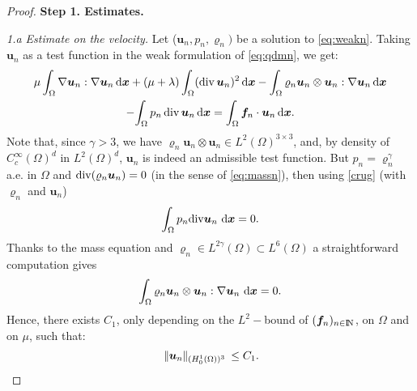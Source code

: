 \documentclass{amsart}
\numberwithin{equation}{section}
\begin{document}
\begin{proof}
{\bf Step 1. Estimates.}
 
{\it 1.a Estimate on the velocity.} Let (${{\boldsymbol u}}_n, p_n, {\varrho}_n)$ be a solution to \eqref{eq:weakn}.
Taking ${{\boldsymbol u}}_n$ as a test function in the weak formulation of \eqref{eq:qdmn}, we get:
\begin{multline*}
\mu \int_\Omega {{\nabla}} {{\boldsymbol u}}_n : {{\nabla}} {{\boldsymbol u}}_n{\, {\rm d}{{\boldsymbol x}}} + (\mu+\lambda)\int_\Omega (\operatorname{div} {\bm{u}}_n)^2 {\, {\rm d}{{\boldsymbol x}}}  - {\int_\Omega {\varrho}_n {{\boldsymbol u}}_n \otimes {{\boldsymbol u}}_n : {{\nabla}} {{\boldsymbol u}}_n{\, {\rm d}{{\boldsymbol x}}}} \\ -  {\int_\Omega p_n \operatorname{div} {{\boldsymbol u}}_n {\, {\rm d}{{\boldsymbol x}}}} = \int_\Omega \bm{f}_n \cdot {{\boldsymbol u}}_n{\, {\rm d}{{\boldsymbol x}}}.
\end{multline*}
Note that, since $\gamma >3$, we have $ {\varrho}_n {{\boldsymbol u}}_n \otimes {{\boldsymbol u}}_n \in L^2(\Omega)^{3 \times 3} $, and, by density of $C_c^\infty(\Omega)^d$ in $L^2(\Omega)^d$, ${{\boldsymbol u}}_n$ is indeed an admissible test function.
But $p_n={\varrho}_n^\gamma$ a.e. in $\Omega$ and ${{\rm div}}({\varrho}_n {{\boldsymbol u}}_n)=0$ (in the sense of \eqref{eq:massn}), then using \eqref{crug}
(with ${\varrho}_n$ and ${{\boldsymbol u}}_n$)
\begin{equation*}
\int_\Omega p_n {{\rm div}} {\bm{u}}_n \, {\, {\rm d}{{\boldsymbol x}}}=0.
\end{equation*}
Thanks to the mass equation and ${\varrho}_n \in L^{2\gamma} (\Omega) \subset L^6(\Omega)$ a straightforward computation gives
\begin{equation*}
{\int_\Omega {\varrho}_n {{\boldsymbol u}}_n \otimes {{\boldsymbol u}}_n : {{\nabla}} {{\boldsymbol u}}_n \, {\, {\rm d}{{\boldsymbol x}}}=0}.
\end{equation*}
Hence, there exists $C_1$, only depending on the $L^2-$bound of $(\bm{f}_n)_{{n \in {\ifmmode{\rm	I\mkern-3.1mu
N\mkern0.5mu}\else{\rm I\kern-.16em
N\hskip0.5pt\ }\fi\relax}}}$,  on $\Omega$ and on $\mu$, such that:
\begin{equation}
{\hspace{.2em}|\hspace{-.1em}| {{{\boldsymbol u}}_n} |\hspace{-.1em}|_{{(H^1_0(\Omega))^3}}\hspace{.2em}} \le C_1.
\label{estu}
\end{equation}


\end{proof}
\end{document}
